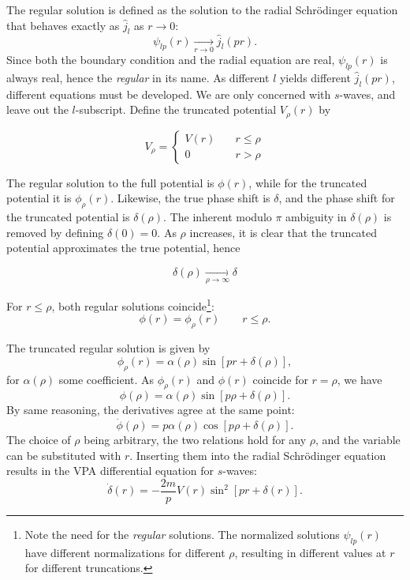 The regular solution is defined as the solution to the radial Schr\"odinger equation that behaves
exactly as \(\hat{j}_{l}\) as \(r\to 0\):
\begin{equation*}
  \psi_{lp}(r) \xrightarrow[r\to 0]{} \hat{j}_{l}(pr).
\end{equation*}
Since both the boundary condition and the radial equation are real,
\(\psi_{lp}(r)\) is always real, hence the \textit{regular} in its name.
As different \(l\) yields
different \(\hat{j}_{l}(pr)\), different equations must be developed. We are
only concerned with \(s\)-waves, and leave out the \(l\)-subscript. Define the
truncated potential \(V_{\rho}(r)\) by

\begin{equation*}
  V_{\rho} =
  \begin{cases}
    V(r) &\quad r \le \rho\\
    0 &\quad r > \rho
  \end{cases}
\end{equation*}

The regular solution to the full potential is \(\phi(r)\), while for the
truncated potential it is \(\phi_{\rho}(r)\). Likewise, the true phase shift is
\(\delta\), and the phase shift for the truncated potential is \(\delta(\rho)\).
The inherent modulo \(\pi\) ambiguity in \(\delta(\rho)\) is removed by defining
\(\delta(0)=0\). As \(\rho\) increases, it is clear that the truncated potential
approximates the true potential, hence

\[\delta(\rho)\xrightarrow[\rho\to\infty]{}\delta\]

For \(r\le \rho\), both regular solutions coincide\footnote{Note the need for
  the \textit{regular} solutions. The normalized solutions \(\psi_{lp}(r)\) have
  different normalizations for different \(\rho\), resulting in different values at \(r\) for different truncations.}:
\begin{equation*}
  \phi(r) = \phi_{\rho}(r) \qquad r \le \rho.
\end{equation*}

The truncated regular solution is given by
\begin{equation*}
  \phi_{\rho}(r) = \alpha(\rho)\sin\left[pr+\delta(\rho)\right],
\end{equation*}
for \(\alpha(\rho)\) some coefficient. As \(\phi_{\rho}(r)\) and \(\phi(r)\)
coincide for \(r=\rho\), we have
\begin{equation*}
  \phi(\rho) =  \alpha(\rho)\sin\left[p\rho+\delta(\rho)\right].
\end{equation*}
By same reasoning, the derivatives agree at the same point:
\begin{equation*}
  \dot{\phi}(\rho) =  p\alpha(\rho)\cos\left[p\rho+\delta(\rho)\right].
\end{equation*}
The choice of \(\rho\) being arbitrary, the two relations hold for any
\(\rho\), and the variable can be substituted with \(r\). Inserting them into the
radial Schr\"odinger equation results in the VPA differential equation for \(s\)-waves:
\begin{equation}
  \label{eq:vpa}
  \dot\delta(r) = -\frac{2m}{p}V(r)\sin^{2}[pr+\delta(r)].
\end{equation}

